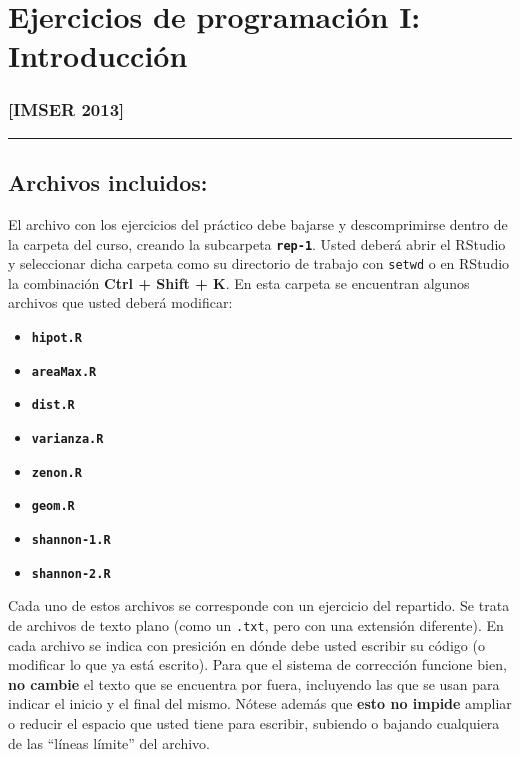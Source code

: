 \documentclass[]{article}
\begin{document}
\section{Ejercicios de programación I: Introducción}

\subsubsection{{[}IMSER 2013{]}}

\begin{center}\rule{3in}{0.4pt}\end{center}

\subsection{Archivos incluidos:}

El archivo con los ejercicios del práctico debe bajarse y descomprimirse
dentro de la carpeta del curso, creando la subcarpeta
\textbf{\texttt{rep-1}}. Usted deberá abrir el RStudio y seleccionar
dicha carpeta como su directorio de trabajo con \texttt{setwd} o en
RStudio la combinación \textbf{Ctrl + Shift + K}. En esta carpeta se
encuentran algunos archivos que usted deberá modificar:

\begin{itemize}
\item
  \textbf{\texttt{hipot.R}}
\item
  \textbf{\texttt{areaMax.R}}
\item
  \textbf{\texttt{dist.R}}
\item
  \textbf{\texttt{varianza.R}}
\item
  \textbf{\texttt{zenon.R}}
\item
  \textbf{\texttt{geom.R}}
\item
  \textbf{\texttt{shannon-1.R}}
\item
  \textbf{\texttt{shannon-2.R}}
\end{itemize}
Cada uno de estos archivos se corresponde con un ejercicio del
repartido. Se trata de archivos de texto plano (como un \texttt{.txt},
pero con una extensión diferente). En cada archivo se indica con
presición en dónde debe usted escribir su código (o modificar lo que ya
está escrito). Para que el sistema de corrección funcione bien,
\textbf{no cambie} el texto que se encuentra por fuera, incluyendo las
que se usan para indicar el inicio y el final del mismo. Nótese además
que \textbf{esto no impide} ampliar o reducir el espacio que usted tiene
para escribir, subiendo o bajando cualquiera de las ``líneas límite''
del archivo.
\end{document}
